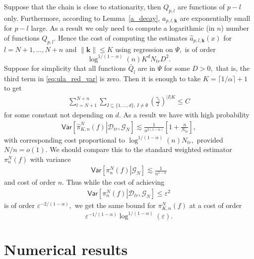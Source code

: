 \documentclass[article]{elsarticle}
\begin{document}
Suppose that the chain is close to stationarity, then \(Q_{p,l}\) are functions of \(p-l\) only.
Furthermore,  according to Lemma~\ref{a_decay}, \(a_{p,l,\mathbf{k}}\) are exponentially small for \(p-l\) large.
As a result we only need to compute a logarithmic (in \(n\)) number of functions \(Q_{p,l}.\)
Hence the cost of computing the estimates  \(\widehat {a}_{p,l,\mathbf{k}}(x)\) for \(l=N+1,\ldots,N+n\) and \(\|\mathbf{k}\|\leq K\) using regression on \(\Psi,\) is of order
\[
\log^{1/(1-\alpha)} (n) K^d  N_{tr} D^2.
\]
Suppose for simplicity that all functions \(\bar{Q}_l\) are in \(\Psi\) for some \(D>0,\) that is, the third term in \eqref{eq:ula_red_var} is zero.  Then it is enough to take \(K=\lceil 1/\alpha \rceil+1\) to get
\begin{eqnarray*}
\sum_{l=N+1}^{N+n}\sum_{I\subseteq\{1,\ldots,d\},\, I\neq \emptyset}
\left(\frac{\gamma_{l}}{2}\right)^{|I|K}\leq C
\end{eqnarray*}
for some constant not depending on \(d.\) As a result we have with high probability
\begin{eqnarray*}
\mathsf{Var}\left[\left.\widehat \pi_{K,n}^N(f)\right | \mathcal{D}_{tr}, \mathcal{G}_N\right]\lesssim \frac{1}{n^{2(1-\alpha)}}\left[1+\frac{n}{N_{tr}}\right],
\end{eqnarray*}
with corresponding cost proportional to \(\log^{1/(1-\alpha)} (n) N_{tr},\) provided \(N/n=o(1).\) We should compare this to the standard weighted estimator \(\pi_{n}^N(f)\) with variance
\begin{eqnarray*}
\mathsf{Var}\left[\left. \pi_{n}^N(f)\right | \mathcal{G}_N\right]\lesssim \frac{1}{n^{1-\alpha}}
\end{eqnarray*}
and cost of order \(n.\) Thus while the cost of achieving
\begin{eqnarray*}
\mathsf{Var}\left[\left. \pi_{n}^N(f)\right | \mathcal{D}_{tr}, \mathcal{G}_N\right]\leq \varepsilon^2
\end{eqnarray*}
is of order  \(\varepsilon^{-2/(1-\alpha)},\) we get the same bound for \(\pi_{K,n}^N(f)\) at a cost of order
\[
\varepsilon^{-1/(1-\alpha)}\log^{1/(1-\alpha)} (\varepsilon).
\]

\section{Numerical results}
\label{sec:num}
\end{document}
